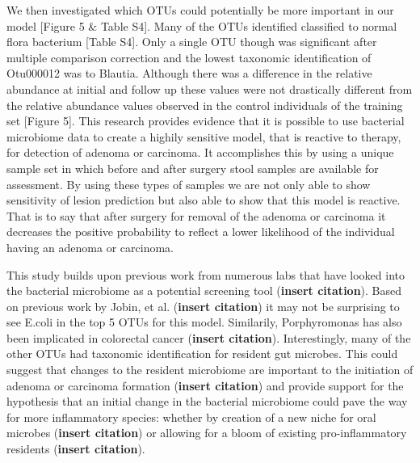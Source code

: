 \documentclass[12pt,]{article}
\begin{document}
We then investigated which OTUs could potentially be more important in
our model {[}Figure 5 \& Table S4{]}. Many of the OTUs identified
classified to normal flora bacterium {[}Table S4{]}. Only a single OTU
though was significant after multiple comparison correction and the
lowest taxonomic identification of Otu000012 was to Blautia. Although
there was a difference in the relative abundance at initial and follow
up these values were not drastically different from the relative
abundance values observed in the control individuals of the training set
{[}Figure 5{]}. This research provides evidence that it is possible to
use bacterial microbiome data to create a highily sensitive model, that
is reactive to therapy, for detection of adenoma or carcinoma. It
accomplishes this by using a unique sample set in which before and after
surgery stool samples are available for assessment. By using these types
of samples we are not only able to show sensitivity of lesion prediction
but also able to show that this model is reactive. That is to say that
after surgery for removal of the adenoma or carcinoma it decreases the
positive probability to reflect a lower likelihood of the individual
having an adenoma or carcinoma.

This study builds upon previous work from numerous labs that have looked
into the bacterial microbiome as a potential screening tool
(\textbf{insert citation}). Based on previous work by Jobin, et al.
(\textbf{insert citation}) it may not be surprising to see E.coli in the
top 5 OTUs for this model. Similarily, Porphyromonas has also been
implicated in colorectal cancer (\textbf{insert citation}).
Interestingly, many of the other OTUs had taxonomic identification for
resident gut microbes. This could suggest that changes to the resident
microbiome are important to the initiation of adenoma or carcinoma
formation (\textbf{insert citation}) and provide support for the
hypothesis that an initial change in the bacterial microbiome could pave
the way for more inflammatory species: whether by creation of a new
niche for oral microbes (\textbf{insert citation}) or allowing for a
bloom of existing pro-inflammatory residents (\textbf{insert citation}).
\end{document}
